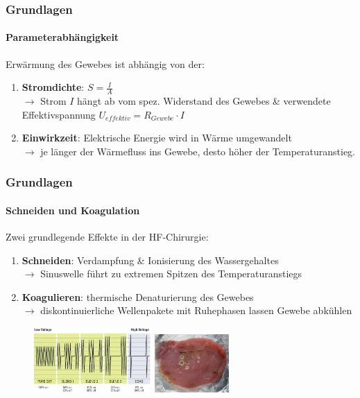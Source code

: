 \documentclass{beamer}
\begin{document}
\begin{frame}
\frametitle{Grundlagen}
\framesubtitle{Parameterabhängigkeit}
\begin{center}
	Erwärmung des Gewebes ist abhängig von der:
\end{center}
\begin{enumerate}
	\item \textbf{Stromdichte}: $S=\frac{I}{A}$
	\\$\rightarrow$ Strom $I$ hängt ab vom spez. Widerstand des Gewebes \& verwendete Effektivspannung $U_{effektiv}=R_{Gewebe}\cdot I$
	\vspace{0.5cm}
	\item \textbf{Einwirkzeit}: Elektrische Energie wird in Wärme umgewandelt
	\\$\rightarrow$ je länger der Wärmefluss ins Gewebe, desto höher der Temperaturanstieg.
\end{enumerate}
\end{frame}


\begin{frame}
\frametitle{Grundlagen}
\framesubtitle{Schneiden und Koagulation}
	Zwei grundlegende Effekte in der HF-Chirurgie:
	\vspace{0.5cm}
	\begin{enumerate}
		\item \textbf{Schneiden}: Verdampfung \& Ionisierung des Wassergehaltes
		\\$\rightarrow$ Sinuswelle führt zu extremen Spitzen des Temperaturanstiegs
		\vspace{0.1cm}
		\item \textbf{Koagulieren}: thermische Denaturierung des Gewebes
		\\$\rightarrow$ diskontinuierliche Wellenpakete mit Ruhephasen lassen Gewebe abkühlen
	\end{enumerate}
	\begin{figure}
	\includegraphics[width=4.5cm]{images/_stromModi.png}
	\hspace{0.5cm}
	\includegraphics[width=2.85cm]{images/fleisch.png}
	\cite{stromModi}
	\end{figure}
\end{frame}
\end{document}
